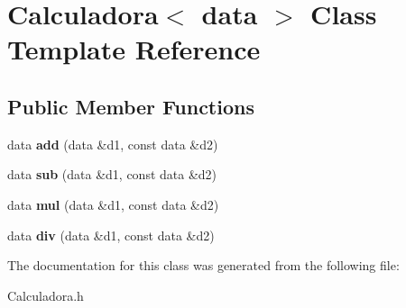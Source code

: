 \hypertarget{class_calculadora}{}\section{Calculadora$<$ data $>$ Class Template Reference}
\label{class_calculadora}
\subsection*{Public Member Functions}
\begin{DoxyCompactItemize}
\item 
data {\bfseries add} (data \&d1, const data \&d2)\hypertarget{class_calculadora_a05dcd61b28120faedfb6dbbd65463af6}{}\label{class_calculadora_a05dcd61b28120faedfb6dbbd65463af6}

\item 
data {\bfseries sub} (data \&d1, const data \&d2)\hypertarget{class_calculadora_aec3d8e1acaa2b0268c0b07d7154d0e40}{}\label{class_calculadora_aec3d8e1acaa2b0268c0b07d7154d0e40}

\item 
data {\bfseries mul} (data \&d1, const data \&d2)\hypertarget{class_calculadora_aa032b0fd70acc7307e9a54d028e9a5b4}{}\label{class_calculadora_aa032b0fd70acc7307e9a54d028e9a5b4}

\item 
data {\bfseries div} (data \&d1, const data \&d2)\hypertarget{class_calculadora_a4b7c80675555ce2ad393d6572634672b}{}\label{class_calculadora_a4b7c80675555ce2ad393d6572634672b}

\end{DoxyCompactItemize}


The documentation for this class was generated from the following file\+:\begin{DoxyCompactItemize}
\item 
Calculadora.\+h\end{DoxyCompactItemize}
